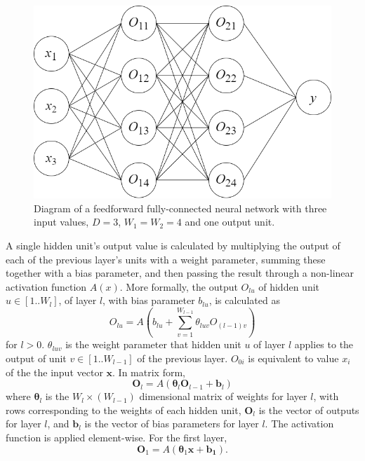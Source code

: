 \documentclass[12pt]{article}
\begin{document}
\begin{figure}[h]
\centering
\includegraphics[width=6in]{images/feedforward_nn.png}
\caption{Diagram of a feedforward fully-connected neural network with three input values, $D=3$, $W_1=W_2=4$ and one output unit.}
\end{figure}

A single hidden unit's output value is calculated by multiplying the output of each of the previous layer's units with a weight parameter, summing these together with a bias parameter, and then passing the result through a non-linear activation function $A(x)$. More formally, the output $O_{lu}$ of hidden unit $u\in[1..W_l]$, of layer $l$, with bias parameter $b_{lu}$, is calculated as
\begin{equation}
O_{lu}=A\left(b_{lu}+\sum_{v=1}^{W_{l-1}}\theta_{luv}O_{(l-1)v}\right)
\end{equation}
for $l > 0$. $\theta_{luv}$ is the weight parameter that hidden unit $u$ of layer $l$ applies to the output of unit $v\in[1..W_{l-1}]$ of the previous layer. $O_{0i}$ is equivalent to value $x_i$ of the the input vector $\bm{x}$. In matrix form,
\begin{equation}
\bm{O}_l=A\left(\boldsymbol\theta_l\bm{O}_{l-1}+\bm{b}_l\right)
\end{equation}
where $\boldsymbol\theta_l$ is the $W_l \times \left(W_{l-1}\right)$ dimensional matrix of weights for layer $l$, with rows corresponding to the weights of each hidden unit, $\bm{O}_l$ is the vector of outputs for layer $l$, and $\bm{b}_l$ is the vector of bias parameters for layer $l$. The activation function is applied element-wise. For the first layer,
\begin{equation}
\bm{O}_1=A\left(\boldsymbol\theta_1\bm{x}+\bm{b_1}\right).
\end{equation}
\end{document}
